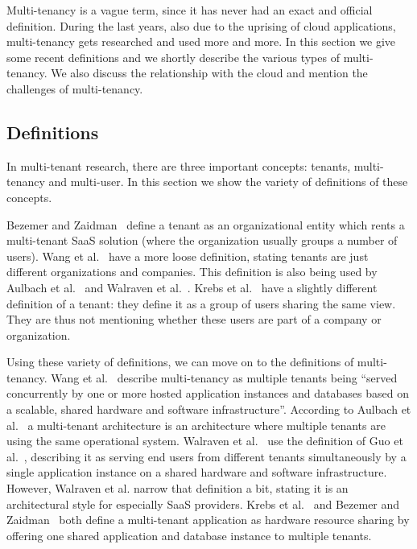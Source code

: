 Multi-tenancy is a vague term, since it has never had an exact and official definition. During the last years, also due to the uprising of cloud applications, multi-tenancy gets researched and used more and more. In this section we give some recent definitions and we shortly describe the various types of multi-tenancy. We also discuss the relationship with the cloud and mention the challenges of multi-tenancy.

\subsection{Definitions}

In multi-tenant research, there are three important concepts: tenants, multi-tenancy and multi-user. In this section we show the variety of definitions of these concepts.

Bezemer and Zaidman~\cite{bezemer2010multi} define a tenant as an organizational entity which rents a multi-tenant \ac{SaaS} solution (where the organization usually groups a number of users). Wang et al.~\cite{wang2008study} have a more loose definition, stating tenants are just different organizations and companies. This definition is also being used by Aulbach et al.~\cite{aulbach2008multi} and Walraven et al.~\cite{walraven2012towards}. Krebs et al.~\cite{krebs2012architecture} have a slightly different definition of a tenant: they define it as a group of users sharing the same view. They are thus not mentioning whether these users are part of a company or organization.

Using these variety of definitions, we can move on to the definitions of multi-tenancy. Wang et al.~\cite{wang2008study} describe multi-tenancy as multiple tenants being ``served concurrently by one or more hosted application instances and databases based on a scalable, shared hardware and software infrastructure''. According to Aulbach et al.~\cite{aulbach2008multi} a multi-tenant architecture is an architecture where multiple tenants are using the same operational system. Walraven et al.~\cite{walraven2012towards} use the definition of Guo et al.~\cite{guo2007framework}, describing it as serving end users from different tenants simultaneously by a single application instance on a shared hardware and software infrastructure. However, Walraven et al. narrow that definition a bit, stating it is an architectural style for especially \ac{SaaS} providers. Krebs et al.~\cite{krebs2012architecture} and Bezemer and Zaidman~\cite{bezemer2010multi} both define a multi-tenant application as hardware resource sharing by offering one shared application and database instance to multiple tenants.

